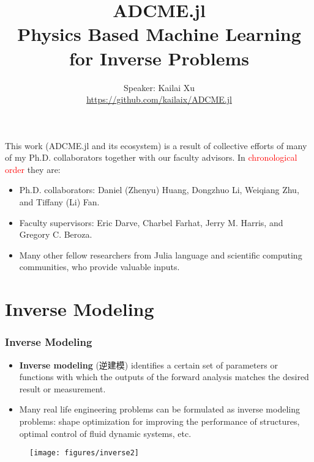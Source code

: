 \documentclass[usenames,dvipsnames]{beamer}
\title[Physics Based Machine Learning]{ADCME.jl \\ {Physics Based Machine Learning for Inverse Problems}} %
\author[ADCME]{Speaker: Kailai Xu\\\url{https://github.com/kailaix/ADCME.jl}} %
\date{}%
\begin{document}
\begin{frame}

\titlepage %

\end{frame}
\usebackgroundtemplate{}




\begin{frame}
	This work (ADCME.jl and its ecosystem) is a result of collective efforts of many of my Ph.D. collaborators together with our faculty advisors. In \textcolor{red}{chronological order} they are:
	
	\begin{itemize}
		\item Ph.D. collaborators: Daniel (Zhenyu) Huang, Dongzhuo Li, Weiqiang Zhu, and Tiffany (Li) Fan. 
		\item Faculty supervisors: Eric Darve, Charbel Farhat, Jerry M. Harris, and Gregory C. Beroza. 
		\item Many other fellow researchers from Julia language and scientific computing communities, who provide valuable inputs. 
	\end{itemize}
\end{frame}



\section{Inverse Modeling}



\begin{frame}
	\frametitle{Inverse Modeling}
	\begin{itemize}
		\item \textbf{Inverse modeling} (逆建模) identifies a certain set of parameters or functions with which the outputs of the forward analysis matches the desired result or measurement.
		\item Many real life engineering problems can be formulated as inverse modeling problems: shape optimization for improving the performance of structures, optimal control of fluid dynamic systems, etc.
	\end{itemize}
	\begin{figure}[hbt]
	\centering
  \texttt{[image: figures/inverse2]}
\end{figure}
\end{frame}
\end{document}
